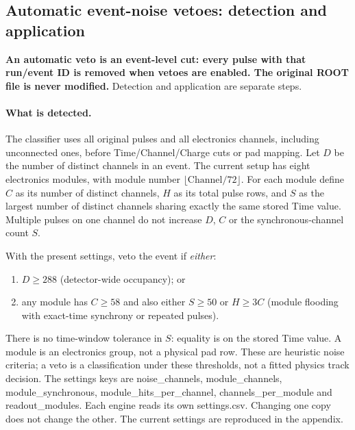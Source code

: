 \documentclass[11pt,a4paper]{article}
\begin{document}
\subsection{Automatic event-noise vetoes: detection and application}
\textbf{An automatic veto is an event-level cut: every pulse with that run/event ID
is removed when vetoes are enabled. The original ROOT file is never modified.}
Detection and application are separate steps.

\paragraph{What is detected.}
The classifier uses all original pulses and all electronics channels, including
unconnected ones, before Time/Channel/Charge cuts or pad mapping. Let $D$ be the
number of distinct channels in an event. The current setup has eight electronics
modules, with module number $\lfloor\mathrm{Channel}/72\rfloor$.
For each module define $C$ as its number of distinct channels, $H$ as its total
pulse rows, and $S$ as the largest number of distinct channels sharing exactly
the same stored Time value. Multiple pulses on one channel do not increase $D$, $C$
or the synchronous-channel count $S$.

With the present settings, veto the event if \emph{either}:
\begin{enumerate}
\item $D\ge288$ (detector-wide occupancy); or
\item any module has $C\ge58$ and also either $S\ge50$ or $H\ge3C$
(module flooding with exact-time synchrony or repeated pulses).
\end{enumerate}
There is no time-window tolerance in $S$: equality is on the stored Time value.
A module is an electronics group, not a physical pad row. These are heuristic noise
criteria; a veto is a classification under these thresholds, not a fitted physics
track decision. The settings keys are noise\_channels, module\_channels,
module\_synchronous, module\_hits\_per\_channel, channels\_per\_module and
readout\_modules. Each engine reads its own settings.csv. Changing one copy does
not change the other. The current settings are reproduced in the appendix.
\end{document}
